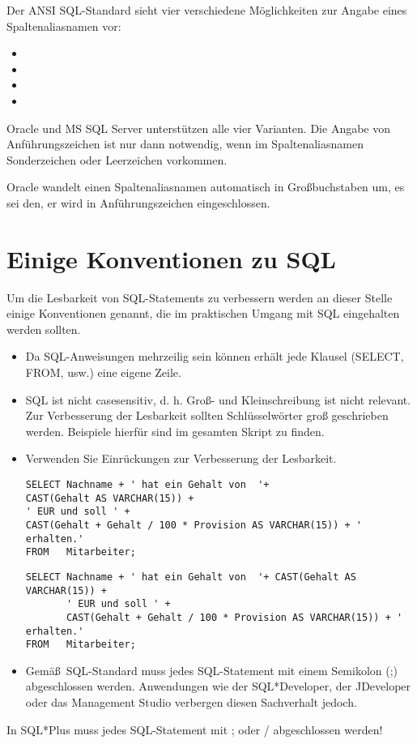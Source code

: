 Der ANSI SQL-Standard sieht vier verschiedene Möglichkeiten zur Angabe eines Spaltenaliasnamen vor:
\begin{itemize}
    \item {}
    \item {}
    \item {}
    \item {}
\end{itemize}
Oracle und MS SQL Server unterstützen alle vier Varianten. Die Angabe von Anführungszeichen ist nur dann notwendig, wenn im Spaltenaliasnamen Sonderzeichen oder Leerzeichen vorkommen.
\begin{merke}
    Oracle wandelt einen Spaltenaliasnamen automatisch in Großbuchstaben um, es sei den, er wird in Anführungszeichen eingeschlossen.
\end{merke}
\section{Einige Konventionen zu SQL}
Um die Lesbarkeit von SQL-Statements zu verbessern werden an dieser Stelle einige Konventionen genannt, die im praktischen Umgang mit SQL eingehalten werden sollten.
\begin{itemize}
    \item Da SQL-Anweisungen mehrzeilig sein können erhält jede Klausel (SELECT, FROM, usw.) eine eigene Zeile.
    \item SQL ist nicht casesensitiv, d. h. Groß- und Kleinschreibung ist nicht relevant. Zur Verbesserung der Lesbarkeit sollten Schlüsselwörter groß geschrieben werden. Beispiele hierfür sind im gesamten Skript zu finden.
    \item Verwenden Sie Einrückungen zur Verbesserung der Lesbarkeit.
          \begin{lstlisting}[language=ms_sql,caption={So nicht!},label=sql01_10]
SELECT Nachname + ' hat ein Gehalt von  '+
CAST(Gehalt AS VARCHAR(15)) +
' EUR und soll ' +
CAST(Gehalt + Gehalt / 100 * Provision AS VARCHAR(15)) + ' erhalten.'
FROM   Mitarbeiter;
          \end{lstlisting}
          \begin{lstlisting}[language=ms_sql,caption={Viel besser lesbar!},label=sql_01_11]
SELECT Nachname + ' hat ein Gehalt von  '+ CAST(Gehalt AS VARCHAR(15)) +
       ' EUR und soll ' +
       CAST(Gehalt + Gehalt / 100 * Provision AS VARCHAR(15)) + ' erhalten.'
FROM   Mitarbeiter;
          \end{lstlisting}
    \item Gemä\ss\ SQL-Standard muss jedes SQL-Statement mit einem Semikolon (;) abgeschlossen werden. Anwendungen wie der SQL*Developer, der JDeveloper oder das Management Studio verbergen diesen Sachverhalt jedoch.
\end{itemize}
\begin{merke}
    In SQL*Plus muss jedes SQL-Statement mit ; oder / abgeschlossen werden!
\end{merke}

